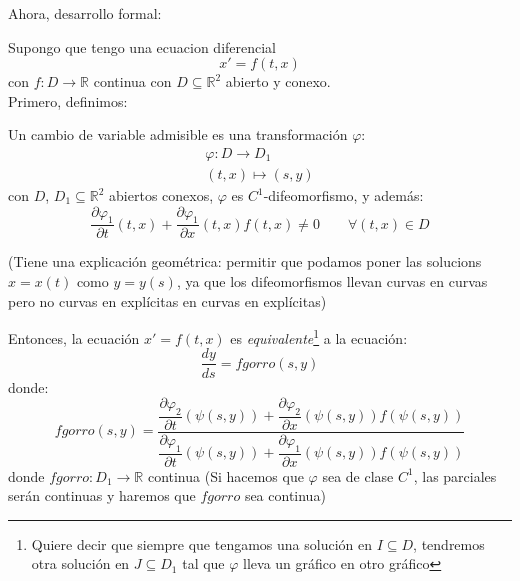 Ahora, desarrollo formal:

Supongo que tengo una ecuacion diferencial
\begin{equation*}
    x' = f(t,x)
\end{equation*}
con $f:D\rightarrow\mathbb{R}$ continua con $D\subseteq \mathbb{R}^2$ abierto y conexo.\\
Primero, definimos:

\begin{definicion}
    Un cambio de variable admisible es una transformación $\varphi$:
    \begin{gather*}
        \varphi:D\rightarrow D_1 \\
        (t,x) \mapsto (s,y)
    \end{gather*}
    con $D$, $D_1\subseteq \mathbb{R}^2$ abiertos conexos, $\varphi$ es $C^1$-difeomorfismo, y además:
    \begin{equation*}
        \dfrac{\partial\varphi_1}{\partial t}(t,x) + \dfrac{\partial\varphi_1}{\partial x}(t,x)f(t,x) \neq 0 \qquad \forall (t,x) \in D
    \end{equation*}

    (Tiene una explicación geométrica: permitir que podamos poner las solucions $x=x(t)$ como $y=y(s)$, ya que los difeomorfismos llevan curvas en curvas pero no curvas en explícitas en curvas en explícitas)
\end{definicion}

Entonces, la ecuación $x'=f(t,x)$ es \textit{equivalente}\footnote{Quiere decir que siempre que tengamos una solución en $I\subseteq D$, tendremos otra solución en $J\subseteq D_1$ tal que $\varphi$ lleva un gráfico en otro gráfico} a la ecuación:
\begin{equation*}
    \dfrac{dy}{ds} = fgorro(s,y)
\end{equation*}
donde:
\begin{equation*}
    fgorro(s,y) = \dfrac{\dfrac{\partial\varphi_2}{\partial t}(\psi(s,y))+\dfrac{\partial\varphi_2}{\partial x}(\psi(s,y))f(\psi(s,y))}{\dfrac{\partial\varphi_1}{\partial t}(\psi(s,y)) + \dfrac{\partial\varphi_1}{\partial x}(\psi(s,y))f(\psi(s,y))}
\end{equation*}
donde $fgorro:D_1 \rightarrow\mathbb{R}$ continua
(Si hacemos que $\varphi$ sea de clase $C^1$, las parciales serán continuas y haremos que $fgorro$ sea continua)

